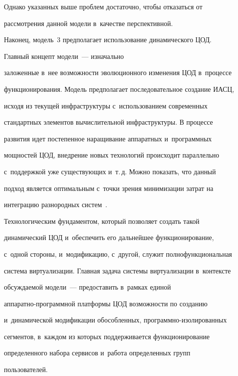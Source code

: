 Однако указанных выше проб\-лем достаточно, чтобы отказаться от 


рассмотрения данной модели в~качестве перспективной.





Наконец, модель~3 предполагает использование динамического ЦОД. 


Главный концепт модели~--- изначально 


заложенные в~нее возможности эволюционного изменения ЦОД в~процессе 


функционирования. Модель предполагает последовательное создание ИАСЦ, 


исходя из текущей инфраструктуры с~использованием современных 


стандартных элементов вычислительной инфраструктуры. В процессе 


развития идет постепенное наращивание аппаратных и~программных 


мощностей ЦОД, внедрение новых технологий происходит параллельно 


с~поддержкой уже существующих и~т.\,д. Можно показать, что данный 


подход является оптимальным с~точки зрения минимизации затрат на 


интеграцию разнородных систем~\cite{8-bs}.





Технологическим фундаментом, который позволяет создать такой 


динамический ЦОД и~обеспечить его дальнейшее функционирование, 


с~одной стороны, и~модификацию, с~другой, служит полнофункциональная 


система виртуализации. Главная задача системы виртуализации в~контексте 


обсуждаемой модели~--- предоставить в~рамках единой  


аппаратно-программной платформы ЦОД возможности по созданию 


и~динамической модификации обособленных, про\-граммно-изолированных 


сегментов, в~каждом из которых поддерживается функционирование 


определенного набора сервисов и~работа определенных групп 


пользователей.





